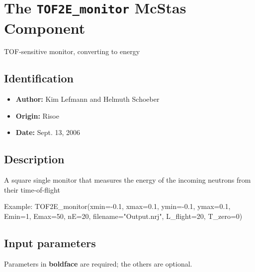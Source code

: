 \section{The \texttt{TOF2E\_monitor} McStas Component}
TOF-sensitive monitor, converting to energy

\subsection*{Identification}
\begin{itemize}
  \item \textbf{Author:} Kim Lefmann and Helmuth Schoeber
  \item \textbf{Origin:} Risoe
  \item \textbf{Date:} Sept. 13, 2006
\end{itemize}

\subsection*{Description}
A square single monitor that measures the energy of the incoming neutrons from their time-of-flight

Example: TOF2E\_monitor(xmin=-0.1, xmax=0.1, ymin=-0.1, ymax=0.1, Emin=1, Emax=50, nE=20, filename="Output.nrj", L\_flight=20, T\_zero=0)

\subsection*{Input parameters}
Parameters in \textbf{boldface} are required; the others are optional.

